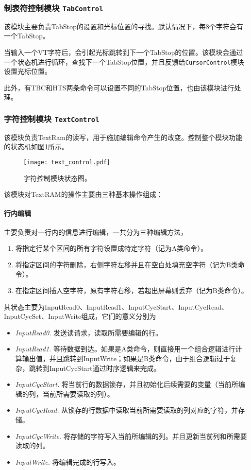 \subsubsection{制表符控制模块 \texttt{TabControl}}
该模块主要负责TabStop的设置和光标位置的寻找。默认情况下，每8个字符会有一个TabStop。

当输入一个VT字符后，会引起光标跳转到下一个TabStop的位置。该模块会通过一个状态机进行循环，查找下一个TabStop位置，并且反馈给\texttt{CursorControl}模块设置光标位置。

此外，有TBC和HTS两条命令可以设置不同的TabStop位置，也由该模块进行处理。
\subsubsection{字符控制模块 \texttt{TextControl}}
该模块负责TextRam的读写，用于施加编辑命令产生的改变。控制整个模块功能的状态机如图\ref{fig:text_control}所示。

\begin{figure}[htbp]
\centerline{
\texttt{[image: text\_control.pdf]}
}
\caption{字符控制模块状态图。}
\label{fig:text_control}
\end{figure}

该模块对TextRAM的操作主要由三种基本操作组成：

\paragraph{行内编辑}
主要负责对一行内的信息进行编辑，一共分为三种编辑方法，
\begin{enumerate}
	\item 将指定行某个区间的所有字符设置成特定字符（记为A类命令）。
	\item 将指定区间的字符删除，右侧字符左移并且在空白处填充空字符（记为B类命令）。
	\item 在指定区间插入空字符，原有字符右移，若超出屏幕则丢弃（记为B类命令）。
\end{enumerate}

其状态主要为InputRead0、InputRead1、InputCycStart、InputCycRead、InputCycSet、InputWrite组成，它们的意义分别为

\begin{itemize}
	\item \textit{InputRead0.} 发送读请求，读取所需要编辑的行。
	\item \textit{InputRead1.} 等待数据到达。如果是A类命令，则直接用一个组合逻辑进行计算输出值，并且跳转到InputWrite；如果是B类命令，由于组合逻辑过于复杂，跳转到InputCycStart通过时序逻辑来完成。
	\item \textit{InputCycStart.} 将当前行的数据锁存，并且初始化后续需要的变量（当前所编辑的列，当前所需要读取的列）。
	\item \textit{InputCycRead.} 从锁存的行数据中读取当前所需要读取的列对应的字符，并存储。
	\item \textit{InputCycWrite.} 将存储的字符写入当前所编辑的列。并且更新当前列和所需要读取的列。
	\item \textit{InputWrite.} 将编辑完成的行写入。
\end{itemize}

